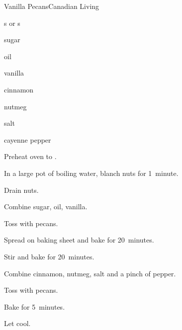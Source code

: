 \begin{recipe}{Vanilla Pecans}{Canadian Living}{}

\begin{ingredients}
\item {} s or s
\item \C{\quarter} sugar
\item {} oil
\item {} vanilla
\item {} cinnamon
\item \tp{\half} nutmeg
\item \tp{\quarter} salt
\item cayenne pepper
\end{ingredients}

\begin{directions}
\item Preheat oven to .
\item In a large pot of boiling water, blanch nuts for 1~minute.
\item Drain nuts.
\item Combine sugar, oil, vanilla.
\item Toss with pecans.
\item Spread on baking sheet and bake for 20~minutes.
\item Stir and bake for 20~minutes.
\item Combine cinnamon, nutmeg, salt and a pinch of pepper.
\item Toss with pecans.
\item Bake for 5~minutes.
\item Let cool.
\end{directions}

\end{recipe}
